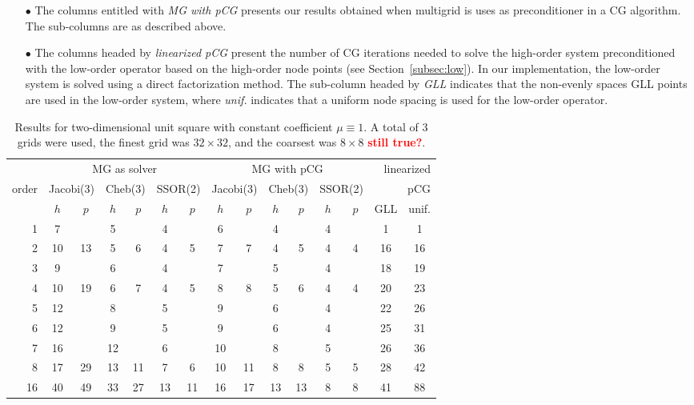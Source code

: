 \documentclass[smallcondensed,final]{svjour3}     %
\newcommand{\todo}[1]{\textcolor{red}{\bf #1}}
\begin{document}
\begin{itemize}
  by \emph{p}; see Section~\ref{subsec:p}). For $p$-multigrid, we
  restrict ourselves to orders that are powers of 2. After coarsening
  in $p$ as till $p=1$, and then coarsen in $h$.
\item[$\bullet$] The columns entitled with \emph{MG with pCG} presents
  our results obtained when multigrid is uses as preconditioner in a
  CG algorithm. The sub-columns are as described above.
\item[$\bullet$] The columns headed by \emph{linearized pCG} present
  the number of CG iterations needed to solve the high-order system
  preconditioned with the low-order operator based on the high-order
  node points (see Section~\ref{subsec:low}). In our implementation,
  the low-order system is solved using a direct factorization method.
  The sub-column headed by \emph{GLL} indicates that the non-evenly
  spaces GLL points are used in the low-order system, where
  \emph{unif.} indicates that a uniform node spacing is used for the
  low-order operator.
\end{itemize}


\begin{table}
  \caption{\label{tab:box} Results for two-dimensional unit square
    with constant coefficient $\mu\equiv 1$.  A total of 3 grids were
    used, the finest grid was $32\times 32$, and the coarsest was
    $8\times 8$ \todo{still true?}.}
  \centering
  \begin{tabular}{|r|c c|c c|c c||c c|c c|c c||c c|} 
    \hline
    & \multicolumn{6}{c||}{MG as solver} & \multicolumn{6}{c||}{MG with pCG} & \multicolumn{2}{r|}{linearized} \\
    \cline{2-13}
    \!\!\! order \!\!\!\! &  \multicolumn{2}{c|}{\!\scriptsize  Jacobi(3)\!} &  \multicolumn{2}{c|}{\!\scriptsize Cheb(3)\!} & \multicolumn{2}{c||}{\!\scriptsize  SSOR(2)\!} & \multicolumn{2}{c|}{\!\scriptsize Jacobi(3)\!} &  \multicolumn{2}{c|}{\!\scriptsize Cheb(3)\!} & \multicolumn{2}{c||}{\!\scriptsize SSOR(2)\!} & \multicolumn{2}{r|}{pCG}\\
\hline
 & $h$ & $p$ & $h$ & $p$& $h$ & $p$& $h$ & $p$& $h$ & $p$& $h$ & $p$& GLL & unif.\\
 \cline{2-15}
1 & 7 & & 5 & & 4 & & 6 & & 4 & & 4 & & 1 & 1  \\
2 & 10 & 13 & 5 & 6 & 4 & 5 & 7 & 7 & 4 & 5 & 4 & 4 & 16 & 16 \\
3 & 9 & & 6 & & 4 & & 7 & & 5 & & 4 & & 18 & 19  \\
4 & 10 & 19 & 6 & 7 & 4 & 5 & 8 & 8 & 5 & 6 & 4 & 4 & 20 & 23 \\
5 & 12 & & 8 & & 5 & & 9 & & 6 & & 4 & & 22 & 26  \\
6 & 12 & & 9 & & 5 & & 9 & & 6 & & 4 & & 25 & 31  \\
7 & 16 & & 12 & & 6 & & 10 & & 8 & & 5 & & 26 & 36  \\
8 & 17 & 29 & 13 & 11 & 7 & 6 & 10 & 11 & 8 & 8 & 5 & 5 & 28 & 42 \\
16 & 40 & 49 & 33 & 27 & 13 & 11 & 16 & 17 & 13 & 13 & 8 & 8 & 41 & 88\\
\hline
  \end{tabular}
\end{table}
\end{document}
